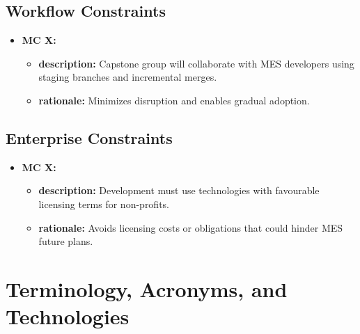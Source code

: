 \documentclass[12pt]{article}
\begin{document}
\subsection{Workflow Constraints}
  \begin{itemize}
    \item \textbf{MC X:}
      \begin{itemize}[label=$\circ$]
        \item \textbf{description:} Capstone group will collaborate with MES developers using staging branches and incremental merges.
        \item \textbf{rationale:} Minimizes disruption and enables gradual adoption.
      \end{itemize}
  \end{itemize}

\subsection{Enterprise Constraints}
  \begin{itemize}
    \item \textbf{MC X:}
      \begin{itemize}[label=$\circ$]
        \item \textbf{description:} Development must use technologies with favourable licensing terms for non-profits.
        \item \textbf{rationale:} Avoids licensing costs or obligations that could hinder MES future plans.
      \end{itemize}
  \end{itemize}


\section{Terminology, Acronyms, and Technologies}
\end{document}

